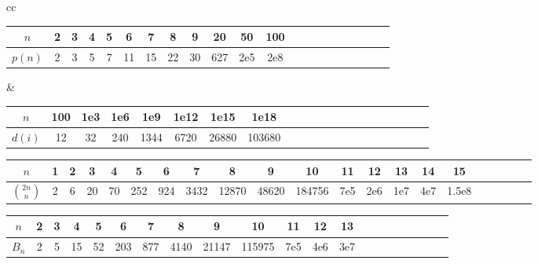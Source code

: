 {
  \setlength{\tabcolsep}{1pt}
  \setlength{\columnsep}{0pt}

  \noindent
  \begin{tabular}{cc}
    \begin{tabular}{@{}c|*{20}{c@{\ }}@{}}
      $n$    & 2 & 3 & 4 & 5 & 6  & 7  & 8  & 9  & 20  & 50  & 100 \\
      \hline
      $p(n)$ & 2 & 3 & 5 & 7 & 11 & 15 & 22 & 30 & 627 & 2e5 & 2e8 \\
    \end{tabular}
      &
      \begin{tabular}{@{}c|*{20}{c@{\ }}@{}}
        $n$
  & 100 & 1e3 & 1e6 & 1e9  & 1e12 & 1e15  & 1e18 \\
  \hline
  $d(i)$ %
  & 12  & 32  & 240 & 1344 & 6720 & 26880 & 103680 \\
      \end{tabular}
  \end{tabular}


  \noindent
  \begin{tabular}{c|*{20}c}
    $n$             & 1 & 2 & 3  & 4  & 5   & 6   & 7    & 8     & 9
                    & 10     & 11  & 12  & 13  & 14  & 15 \\
                    \hline
    $\binom{2n}{n}$ & 2 & 6 & 20 & 70 & 252 & 924 & 3432 & 12870 & 48620
                    & 184756 & 7e5 & 2e6 & 1e7 & 4e7 & 1.5e8 \\
  \end{tabular}

  \noindent
  \begin{tabular}{c|*{20}c}
    $n$             & 2 & 3  & 4  & 5   & 6   & 7    & 8     & 9 & 10     & 11  & 12  & 13  \\
                    \hline
    $B_n$           & 2 & 5 & 15 & 52 & 203 & 877 & 4140 & 21147 & 115975 & 7e5 & 4e6 & 3e7 \\
  \end{tabular}
}

